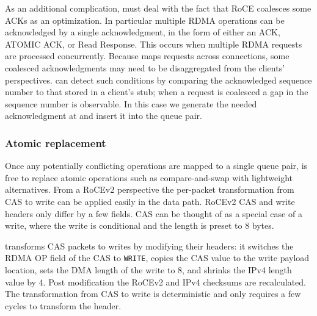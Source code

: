 As an additional complication, {\sword} must deal with the fact
that RoCE coalesces some ACKs as an optimization.  In particular
multiple RDMA operations can be acknowledged by a single
acknowledgment, in the form of either an ACK, ATOMIC ACK, or Read
Response. This occurs when multiple RDMA requests are processed
concurrently.  Because {\sword} maps requests across connections, some
coalesced acknowledgments may need to be disaggregated from the
clients' perspectives.
%
{\sword} can detect such conditions by comparing the
acknowledged sequence number to that stored in a client's stub; when a
request is coalesced a gap in the sequence number is observable. In
this case we generate the needed acknowledgment at {\sword} and
insert it into the queue pair.



\subsubsection{Atomic replacement} 

Once any potentially conflicting operations are mapped to a single
queue pair, {\sword} is free to replace atomic operations such as
compare-and-swap with lightweight alternatives.  From a RoCEv2 perspective
the per-packet transformation from CAS to write can be applied easily
in the data path.  RoCEv2 CAS and write headers only differ by a few
fields. CAS can be thought of as a special case of a write, where the
write is conditional and the length is preset to 8 bytes.

{\sword} transforms CAS packets to writes by modifying their headers: it
switches the RDMA OP field of the CAS to \texttt{WRITE}, copies the CAS
value to the write payload location, sets the DMA length of the write
to 8, and shrinks the IPv4 length value by 4.  Post modification the RoCEv2
and IPv4 checksums are recalculated.
The transformation from CAS to write
is deterministic and only requires a few cycles to transform the
header.

